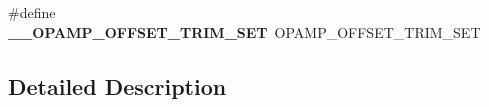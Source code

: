 \begin{DoxyCompactItemize}
\item 
\hypertarget{group___h_a_l___o_p_a_m_p___aliased___macros_ga1b8216e44e3f38a0c394d4451fae1255}{\#define {\bfseries \-\_\-\-\_\-\-O\-P\-A\-M\-P\-\_\-\-O\-F\-F\-S\-E\-T\-\_\-\-T\-R\-I\-M\-\_\-\-S\-E\-T}~O\-P\-A\-M\-P\-\_\-\-O\-F\-F\-S\-E\-T\-\_\-\-T\-R\-I\-M\-\_\-\-S\-E\-T}\label{group___h_a_l___o_p_a_m_p___aliased___macros_ga1b8216e44e3f38a0c394d4451fae1255}

\end{DoxyCompactItemize}


\subsection{Detailed Description}
